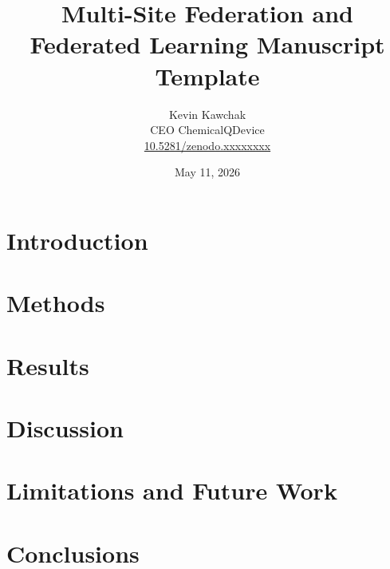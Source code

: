 \documentclass[11pt]{article}
\title{Multi-Site Federation and Federated Learning Manuscript Template}
\author{
  Kevin Kawchak\hspace{2pt}\orcidicon{0009-0007-5457-8667} \\
  CEO ChemicalQDevice\\
  \href{https://doi.org/10.5281/zenodo.xxxxxxxx}{10.5281/zenodo.xxxxxxxx} \\
}
\date{May 11, 2026}
\begin{document}
\maketitle

\begin{abstract}

\end{abstract}

\keywords{ }

\vspace{-0.2cm}

\section{Introduction}
\label{sec:introduction}


\tableofcontents
\vspace{0.4cm}

\newpage
\section{Methods}
\label{sec:methods}

\newpage

\section{Results}
\label{sec:results}

\newpage

\section{Discussion}
\label{sec:discussion}


\section{Limitations and Future Work}
\label{sec:limitations}

\newpage

\section{Conclusions}
\label{sec:conclusions}

\newpage

{}
\begingroup
\raggedright


\endgroup
\newpage


\end{document}
